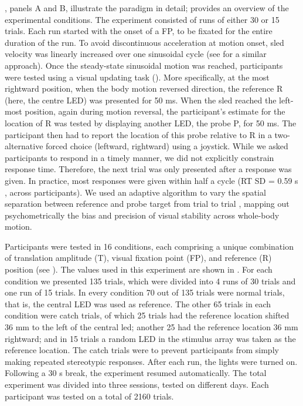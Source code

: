 , panels A and B, illustrate the paradigm in detail;  provides an overview of the experimental conditions. The experiment consisted of runs of either 30 or 15 trials. Each run started with the onset of a FP, to be fixated for the entire duration of the run. To avoid discontinuous acceleration at motion onset, sled velocity was linearly increased over one sinusoidal cycle (see  for a similar approach). Once the steady-state sinusoidal motion was reached, participants were tested using a visual updating task (). More specifically, at the most rightward position, when the body motion reversed direction, the reference R (here, the centre LED) was presented for 50 \si{\milli\second}. When the sled reached the left-most position, again during motion reversal, the participant's estimate for the location of R was tested by displaying another LED, the probe P, for 50 \si{\milli\second}. The participant then had to report the location of this probe relative to R in a two-alternative forced choice (leftward, rightward) using a joystick. While we asked participants to respond in a timely manner, we did not explicitly constrain response time. Therefore, the next trial was only presented after a response was given. In practice, most responses were given within half a cycle (RT {\textpm}SD = 0.59 \si{\second} , across participants). We used an adaptive algorithm to vary the spatial separation between reference and probe target from trial to trial \cite{kontsevich1999}, mapping out psychometrically the bias and precision of visual stability across whole-body motion. 

Participants were tested in 16 conditions, each comprising a unique combination of translation amplitude (T), visual fixation point (FP), and reference (R) position (see ). The values used in this experiment are shown in . For each condition we presented 135 trials, which were divided into 4 runs of 30 trials and one run of 15 trials. In every condition 70 out of 135 trials were normal trials, that is, the central LED was used as reference. The other 65 trials in each condition were catch trials, of which 25 trials had the reference location shifted 36 mm to the left of the central led; another 25 had the reference location 36 \si{\milli\metre} rightward; and in 15 trials a random LED in the stimulus array was taken as the reference location. The catch trials were to prevent participants from simply making repeated stereotypic responses. After each run, the lights were turned on. Following a 30 s break, the experiment resumed automatically. The total experiment was divided into three sessions, tested on different days.  Each participant was tested on a total of 2160 trials.

